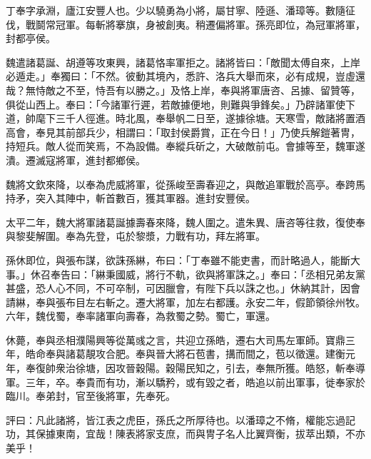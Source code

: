 \begin{pinyinscope}
 
 
 丁奉字承淵，廬江安豐人也。少以驍勇為小將，屬甘寧、陸遜、潘璋等。數隨征伐，戰鬬常冠軍。每斬將搴旗，身被創夷。稍遷偏將軍。孫亮即位，為冠軍將軍，封都亭侯。
 
 
 
 
 魏遣諸葛誕、胡遵等攻東興，諸葛恪率軍拒之。諸將皆曰：「敵聞太傅自來，上岸必遁走。」奉獨曰：「不然。彼動其境內，悉許、洛兵大舉而來，必有成規，豈虛還哉？無恃敵之不至，恃吾有以勝之。」及恪上岸，奉與將軍唐咨、呂據、留贊等，俱從山西上。奉曰：「今諸軍行遲，若敵據便地，則難與爭鋒矣。」乃辟諸軍使下道，帥麾下三千人徑進。時北風，奉舉帆二日至，遂據徐塘。天寒雪，敵諸將置酒高會，奉見其前部兵少，相謂曰：「取封侯爵賞，正在今日！」乃使兵解鎧著冑，持短兵。敵人從而笑焉，不為設備。奉縱兵斫之，大破敵前屯。會據等至，魏軍遂潰。遷滅寇將軍，進封都鄉侯。
 
 
 
 
 魏將文欽來降，以奉為虎威將軍，從孫峻至壽春迎之，與敵追軍戰於高亭。奉跨馬持矛，突入其陣中，斬首數百，獲其軍器。進封安豐侯。
 
 
 
 
 太平二年，魏大將軍諸葛誕據壽春來降，魏人圍之。遣朱異、唐咨等往救，復使奉與黎斐解圍。奉為先登，屯於黎漿，力戰有功，拜左將軍。
 
 
 
 
 孫休即位，與張布謀，欲誅孫綝，布曰：「丁奉雖不能吏書，而計略過人，能斷大事。」休召奉告曰：「綝秉國威，將行不軌，欲與將軍誅之。」奉曰：「丞相兄弟友黨甚盛，恐人心不同，不可卒制，可因臘會，有陛下兵以誅之也。」休納其計，因會請綝，奉與張布目左右斬之。遷大將軍，加左右都護。永安二年，假節領徐州牧。六年，魏伐蜀，奉率諸軍向壽春，為救蜀之勢。蜀亡，軍還。
 
 
 
 
 休薨，奉與丞相濮陽興等從萬彧之言，共迎立孫皓，遷右大司馬左軍師。寶鼎三年，皓命奉與諸葛靚攻合肥。奉與晉大將石苞書，搆而間之，苞以徵還。建衡元年，奉復帥衆治徐塘，因攻晉穀陽。穀陽民知之，引去，奉無所獲。皓怒，斬奉導軍。三年，卒。奉貴而有功，漸以驕矜，或有毀之者，皓追以前出軍事，徙奉家於臨川。奉弟封，官至後將軍，先奉死。
 
 
 
 
 評曰：凡此諸將，皆江表之虎臣，孫氏之所厚待也。以潘璋之不脩，權能忘過記功，其保據東南，宜哉！陳表將家支庶，而與冑子名人比翼齊衡，拔萃出類，不亦美乎！
 
 
\end{pinyinscope}